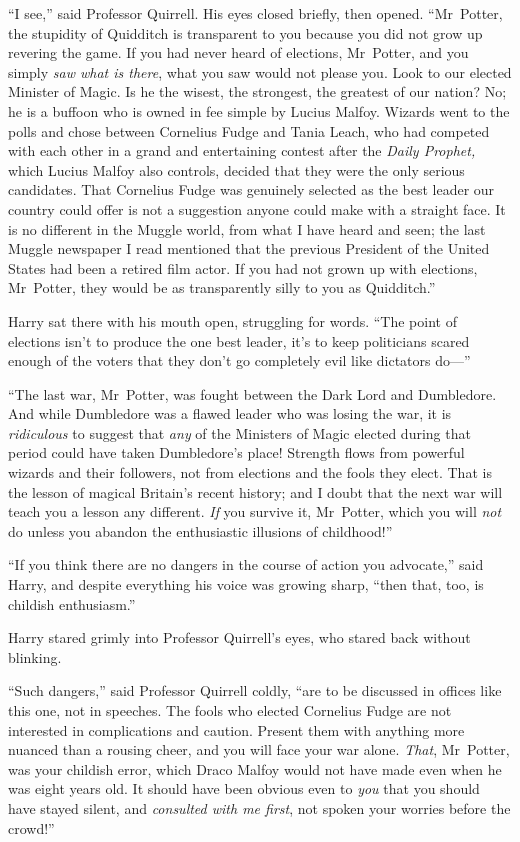 “I see,” said Professor Quirrell. His eyes closed briefly, then opened.
“Mr~Potter, the stupidity of Quidditch is transparent to you because you did
not grow up revering the game. If you had never heard of elections, Mr~Potter,
and you simply \emph{saw what is there}, what you saw would not please you.
Look to our elected Minister of Magic. Is he the wisest, the strongest, the
greatest of our nation? No; he is a buffoon who is owned in fee simple by
Lucius Malfoy. Wizards went to the polls and chose between Cornelius Fudge and
Tania Leach, who had competed with each other in a grand and entertaining
contest after the \emph{Daily Prophet,} which Lucius Malfoy also controls,
decided that they were the only serious candidates. That Cornelius Fudge was
genuinely selected as the best leader our country could offer is not a
suggestion anyone could make with a straight face. It is no different in the
Muggle world, from what I have heard and seen; the last Muggle newspaper I read
mentioned that the previous President of the United States had been a retired
film actor. If you had not grown up with elections, Mr~Potter, they would be
as transparently silly to you as Quidditch.”

Harry sat there with his mouth open, struggling for words. “The point of
elections isn’t to produce the one best leader, it’s to keep politicians scared
enough of the voters that they don’t go completely evil like dictators do—”

“The last war, Mr~Potter, was fought between the Dark Lord and Dumbledore. And
while Dumbledore was a flawed leader who was losing the war, it is
\emph{ridiculous} to suggest that \emph{any} of the Ministers of Magic elected
during that period could have taken Dumbledore’s place! Strength flows from
powerful wizards and their followers, not from elections and the fools they
elect. That is the lesson of magical Britain’s recent history; and I doubt that
the next war will teach you a lesson any different. \emph{If} you survive it,
Mr~Potter, which you will \emph{not} do unless you abandon the enthusiastic
illusions of childhood!”

“If you think there are no dangers in the course of action you advocate,” said
Harry, and despite everything his voice was growing sharp, “then that, too, is
childish enthusiasm.”

Harry stared grimly into Professor Quirrell’s eyes, who stared back without
blinking.

“Such dangers,” said Professor Quirrell coldly, “are to be discussed in offices
like this one, not in speeches. The fools who elected Cornelius Fudge are not
interested in complications and caution. Present them with anything more
nuanced than a rousing cheer, and you will face your war alone. \emph{That},
Mr~Potter, was your childish error, which Draco Malfoy would not have made
even when he was eight years old. It should have been obvious even to
\emph{you} that you should have stayed silent, and \emph{consulted with me
first}, not spoken your worries before the crowd!”

